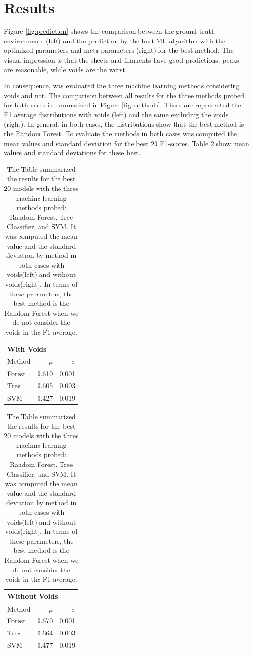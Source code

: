 \documentclass[usenatbib]{mnras}
\begin{document}
\section{Results}\label{sec:results}
Figure \ref{fig:prediction} shows the comparison between the ground truth environments (left) and the prediction by the best ML algorithm with the optimized parameters and meta-parameters (right) for the best method.
The visual impression is that the sheets and filaments have good predictions,
peaks are reasonable, while voids are the worst.

In consequence, was evaluated the three machine learning methods considering voids and not.
The comparison between all results for the three methods probed for both cases is summarized in Figure \ref{fig:methods}. 
There are represented the F1 average distributions with voids (left) and the same excluding the voids (right). 
In general, in both cases, the distributions show that the best method is the Random Forest. 
To evaluate the methods in both cases was computed the mean values and standard deviation for the best 20 F1-scores. Table \ref{tab:methods} show mean values and standard deviations for these best. 

\begin{table}
\centering
\begin{tabular}{lrr}
\hline
\multicolumn{3}{l}{With Voids}\\
\hline
 Method   &   $\mu$ &   $\sigma$ \\
\hline
 Forest   &   0.610 &      0.001 \\
 Tree     &   0.605 &      0.003 \\
 SVM      &   0.427 &      0.019 \\
\hline
\end{tabular}
\begin{tabular}{lrr}
\hline
\multicolumn{3}{l}{Without Voids}\\
\hline
 Method   &   $\mu$ &   $\sigma$ \\
\hline
 Forest   &   0.670 &      0.001 \\
 Tree     &   0.664 &      0.003 \\
 SVM      &   0.477 &      0.019 \\
\hline
\end{tabular}
\caption{The Table summarized the results for the best 20 models with the three machine learning methods probed: Random Forest, Tree Classifier, and SVM. It was computed the mean value and the standard deviation by method in both cases with voids(left) and without voids(right). In terms of these parameters, the best method is the Random Forest when we do not consider the voids in the F1 average.}
\label{tab:methods}
\end{table}
\end{document}
